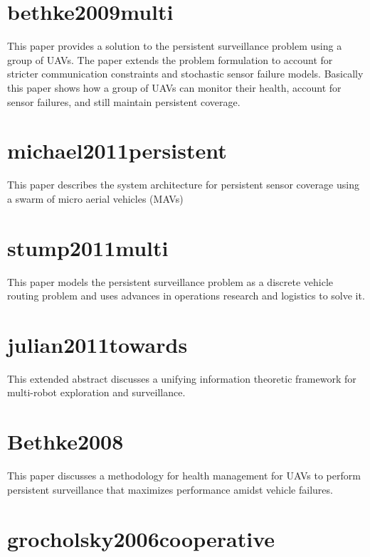 \documentclass{article}
\begin{document}
\section{bethke2009multi~\cite{bethke2009multi}}

This paper provides a solution to the persistent surveillance problem using a
group of UAVs. The paper extends the problem formulation to account for
stricter communication constraints and stochastic sensor failure models.
Basically this paper shows how a group of UAVs can monitor their health,
account for sensor failures, and still maintain persistent coverage.


\section{michael2011persistent~\cite{michael2011persistent}}

This paper describes the system architecture for persistent sensor coverage
using a swarm of micro aerial vehicles (MAVs)

\section{stump2011multi~\cite{stump2011multi}}

This paper models the persistent surveillance problem as a discrete vehicle
routing problem and uses advances in operations research and logistics to solve
it.

\section{julian2011towards~\cite{julian2011towards}}

This extended abstract discusses a unifying information theoretic framework for
multi-robot exploration and surveillance.

\section{Bethke2008~\cite{Bethke2008}}

This paper discusses a methodology for health management for UAVs to perform
persistent surveillance that maximizes performance amidst vehicle failures.

\section{grocholsky2006cooperative~\cite{grocholsky2006cooperative}}
\end{document}
